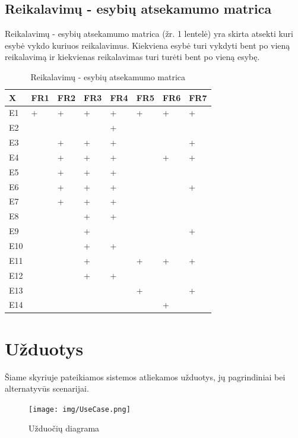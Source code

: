 \documentclass{VUMIFPSkursinis}
\begin{document}
	\subsection{Reikalavimų - esybių atsekamumo matrica}\label{strukturinisDSModelis_matrica}
		Reikalavimų - esybių atsekamumo matrica (žr. 1 lentelė) yra skirta atsekti kuri esybė vykdo kuriuos reikalavimus.
		Kiekviena esybė turi vykdyti bent po vieną reikalavimą ir kiekvienas reikalavimas turi turėti bent po vieną esybę.
			\begin{table}[H]\footnotesize
  \centering
  \caption{Reikalavimų - esybių atsekamumo matrica}
  \resizebox{\textwidth}{!}
  {\begin{tabular}{|l| l| l| l| l| l| l| l|} \hline
    	X		& FR1		& FR2		& FR3		& FR4		& FR5		& FR6		& FR7\\
\hline
	E1		&+		&+		&+		&+		&+		&+		&+\\
\hline
	E2		&		&		&		&+		&		&		&\\
\hline
	E3		&		&+		&+		&+		&		&		&+\\
\hline
	E4		&		&+		&+		&+		&		&+		&+\\
\hline
	E5		&		&+		&+		&+		&		&		&\\
\hline
	E6		&		&+		&+		&+		&		&		&+\\
\hline
	E7		&		&+		&+		&+		&		&		&\\
\hline
	E8		&		&		&+		&+		&		&		&\\
\hline
	E9		&		&		&+		&		&		&		&+\\
\hline
	E10		&		&		&+		&+		&		&		&\\
\hline
	E11		&		&		&+		&		&+		&+		&+\\
\hline
	E12		&		&		&+		&+		&		&		&\\
\hline
	E13		&		&		&		&		&+		&		&+\\
\hline
	E14		&		&		&		&		&		&+		&\\
\hline
  \end{tabular}}
  \label{tab:table example}
\end{table}

\section{Užduotys}
	Šiame skyriuje pateikiamos sistemos atliekamos užduotys, 
	jų pagrindiniai bei alternatyvūs scenarijai.
	\begin{figure}[H]
		\centering
		\texttt{[image: img/UseCase.png]}
		\caption{Užduočių diagrama}
		\label{img:psi2-use-case}
	\end{figure}
\end{document}
